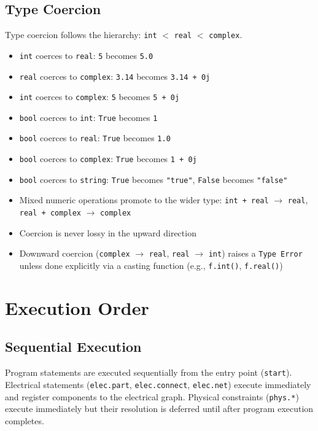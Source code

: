 \section{Type Coercion}
Type coercion follows the hierarchy: \texttt{int} $<$ \texttt{real} $<$ \texttt{complex}.
\begin{itemize}
\item \texttt{int} coerces to \texttt{real}: \texttt{5} becomes \texttt{5.0}
\item \texttt{real} coerces to \texttt{complex}: \texttt{3.14} becomes \texttt{3.14 + 0j}
\item \texttt{int} coerces to \texttt{complex}: \texttt{5} becomes \texttt{5 + 0j}
\item \texttt{bool} coerces to \texttt{int}: \texttt{True} becomes \texttt{1}
\item \texttt{bool} coerces to \texttt{real}: \texttt{True} becomes \texttt{1.0}
\item \texttt{bool} coerces to \texttt{complex}: \texttt{True} becomes \texttt{1 + 0j}
\item \texttt{bool} coerces to \texttt{string}: \texttt{True} becomes \texttt{"true"}, \texttt{False} becomes \texttt{"false"}
\item Mixed numeric operations promote to the wider type: \texttt{int + real} $\rightarrow$ \texttt{real}, \texttt{real + complex} $\rightarrow$ \texttt{complex}
\item Coercion is never lossy in the upward direction
\item Downward coercion (\texttt{complex} $\rightarrow$ \texttt{real}, \texttt{real} $\rightarrow$ \texttt{int}) raises a \texttt{Type Error} unless done explicitly via a casting function (e.g., \texttt{f.int()}, \texttt{f.real()})
\end{itemize}


\chapter{Execution Order}  %

\section{Sequential Execution}
Program statements are executed sequentially from the entry point (\texttt{start}). Electrical statements (\texttt{elec.part}, \texttt{elec.connect}, \texttt{elec.net}) execute immediately and register components to the electrical graph. Physical constraints (\texttt{phys.*}) execute immediately but their resolution is deferred until after program execution completes.

